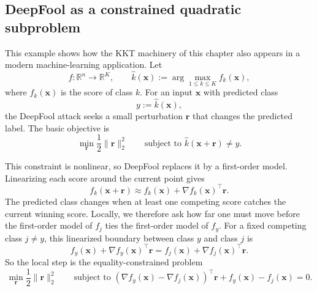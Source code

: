 \subsection{DeepFool as a constrained quadratic subproblem}
\begin{example}
\label{ex:ch7-deepfool}
This example shows how the KKT machinery of this chapter also appears in a
modern machine-learning application. Let
\[
  f:\mathbb{R}^n \to \mathbb{R}^K,
  \qquad
  \hat k(\mathbf{x}) := \arg\max_{1\le k\le K} f_k(\mathbf{x}),
\]
where $f_k(\mathbf{x})$ is the score of class $k$. For an input
$\mathbf{x}$ with predicted class
\[
  y := \hat k(\mathbf{x}),
\]
the DeepFool attack seeks a small perturbation $\mathbf{r}$ that changes the
predicted label. The basic objective is
\[
  \min_{\mathbf{r}} \frac12 \|\mathbf{r}\|_2^2
  \qquad
  \text{subject to }
  \hat k(\mathbf{x}+\mathbf{r}) \neq y.
\]

This constraint is nonlinear, so DeepFool replaces it by a first-order model.
Linearizing each score around the current point gives
\[
  f_k(\mathbf{x}+\mathbf{r})
  \approx
  f_k(\mathbf{x}) + \nabla f_k(\mathbf{x})^\top \mathbf{r}.
\]
The predicted class changes when at least one competing score catches the
current winning score. Locally, we therefore ask how far one must move before
the first-order model of $f_j$ ties the first-order model of $f_y$.
For a fixed competing class $j\neq y$, this linearized boundary between class
$y$ and class $j$ is
\[
  f_y(\mathbf{x}) + \nabla f_y(\mathbf{x})^\top \mathbf{r}
  =
  f_j(\mathbf{x}) + \nabla f_j(\mathbf{x})^\top \mathbf{r}.
\]
So the local step is the equality-constrained problem
\begin{equation}
  \label{eq:ch7-deepfool-subproblem}
  \min_{\mathbf{r}} \frac12 \|\mathbf{r}\|_2^2
  \qquad
  \text{subject to }
  (\nabla f_y(\mathbf{x})-\nabla f_j(\mathbf{x}))^\top \mathbf{r}
  + f_y(\mathbf{x}) - f_j(\mathbf{x}) = 0.
\end{equation}


\end{example}
